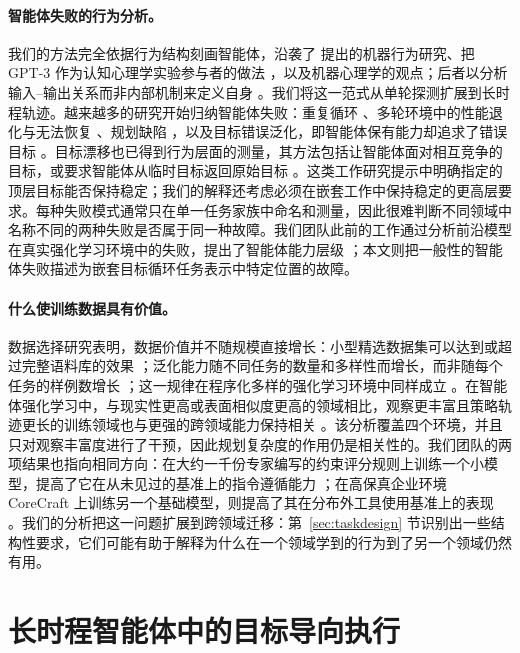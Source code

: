 \documentclass[10pt]{article}
\begin{document}
\paragraph{智能体失败的行为分析。}
我们的方法完全依据行为结构刻画智能体，沿袭了 \citet{rahwan2019machine} 提出的机器行为研究、把 GPT-3 作为认知心理学实验参与者的做法 \citep{binz2023cogpsych}，以及机器心理学的观点；后者以分析输入--输出关系而非内部机制来定义自身 \citep{hagendorff2024machine}。我们将这一范式从单轮探测扩展到长时程轨迹。越来越多的研究开始归纳智能体失败：重复循环 \citep{yao2023react}、多轮环境中的性能退化与无法恢复 \citep{laban2025lost}、规划缺陷 \citep{valmeekam2023planbench, kambhampati2024llmmodulo}，以及目标错误泛化，即智能体保有能力却追求了错误目标 \citep{langosco2022goal, shah2022goal}。目标漂移也已得到行为层面的测量，其方法包括让智能体面对相互竞争的目标，或要求智能体从临时目标返回原始目标 \citep{arike2025goaldrift}。这类工作研究提示中明确指定的顶层目标能否保持稳定；我们的解释还考虑必须在嵌套工作中保持稳定的更高层要求。每种失败模式通常只在单一任务家族中命名和测量，因此很难判断不同领域中名称不同的两种失败是否属于同一种故障。我们团队此前的工作通过分析前沿模型在真实强化学习环境中的失败，提出了智能体能力层级 \citep{ritchie2026hierarchy}；本文则把一般性的智能体失败描述为嵌套目标循环任务表示中特定位置的故障。

\paragraph{什么使训练数据具有价值。}
数据选择研究表明，数据价值并不随规模直接增长：小型精选数据集可以达到或超过完整语料库的效果 \citep{zhou2023lima, xia2024less, liu2024deita}；泛化能力随不同任务的数量和多样性而增长，而非随每个任务的样例数增长 \citep{wei2021flan, chung2022scaling, zhang2024instruction}；这一规律在程序化多样的强化学习环境中同样成立 \citep{cobbe2020procgen}。在智能体强化学习中，与现实性更高或表面相似度更高的领域相比，观察更丰富且策略轨迹更长的训练领域也与更强的跨领域能力保持相关 \citep{liu2026generalizationtax}。该分析覆盖四个环境，并且只对观察丰富度进行了干预，因此规划复杂度的作用仍是相关性的。我们团队的两项结果也指向相同方向：在大约一千份专家编写的约束评分规则上训练一个小模型，提高了它在从未见过的基准上的指令遵循能力 \citep{surge2026complexif}；在高保真企业环境 CoreCraft 上训练另一个基础模型，则提高了其在分布外工具使用基准上的表现 \citep{mehta2026corecraft}。我们的分析把这一问题扩展到跨领域迁移：第~\ref{sec:taskdesign} 节识别出一些结构性要求，它们可能有助于解释为什么在一个领域学到的行为到了另一个领域仍然有用。

\section{长时程智能体中的目标导向执行}
\label{sec:taskmodel}
\end{document}
